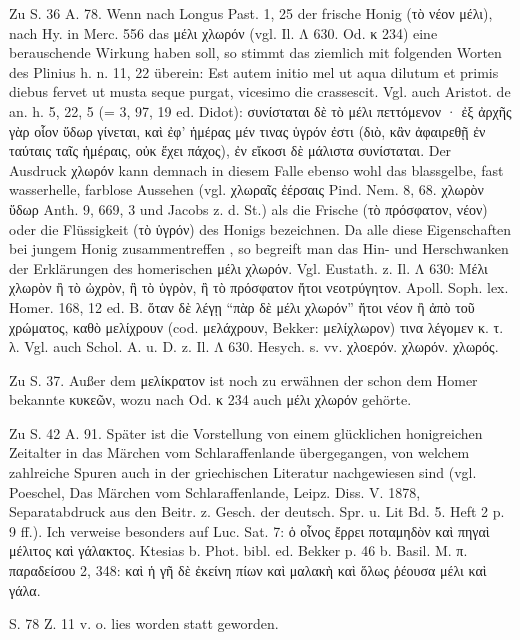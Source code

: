 \documentclass[a4paper, 11pt, oneside]{article}
\begin{document}
Zu S. 36 A. 78. Wenn nach Longus Past. 1, 25 der frische Honig (τὸ νέον μέλι), nach Hy. in Merc. 556 das μέλι χλωρόν (vgl. Il. Λ 630. Od. κ 234) eine berauschende Wirkung haben soll, so stimmt das ziemlich mit folgenden Worten des Plinius h. n. 11, 22 überein: Est autem initio mel ut aqua dilutum et primis diebus fervet ut musta seque purgat, vicesimo die crassescit. Vgl. auch Aristot. de an. h. 5, 22, 5 (= 3, 97, 19 ed. Didot): συνίσταται δὲ τὸ μέλι πεττόμενον · ἐξ ἀρχῆς γὰρ οἷον ὕδωρ γίνεται, καὶ ἐφ' ἡμέρας μέν τινας ὑγρόν ἐστι (διὸ, κἂν ἀφαιρεθῇ ἐν ταύταις ταῖς ἡμέραις, οὐκ ἔχει πάχος), ἐν εἴκοσι δὲ μάλιστα συνίσταται. Der Ausdruck χλωρόν kann demnach in diesem Falle ebenso wohl das blassgelbe, fast wasserhelle, farblose Aussehen (vgl. χλωραῖς ἐέρσαις Pind. Nem. 8, 68. χλωρὸν ὕδωρ Anth. 9, 669, 3 und Jacobs z. d. St.) als die Frische (τὸ πρόσφατον, νέον) oder die Flüssigkeit (τὸ ὑγρόν) des Honigs bezeichnen. Da alle diese Eigenschaften bei jungem Honig zusammentreffen , so begreift man das Hin- und Herschwanken der Erklärungen des homerischen μέλι χλωρόν. Vgl. Eustath. z. Il. Λ 630: Μέλι χλωρὸν ἢ τὸ ὠχρὸν, ἢ τὸ ὑγρὸν, ἢ τὸ πρόσφατον ἤτοι νεοτρύγητον. Apoll. Soph. lex. Homer. 168, 12 ed. B. ὅταν δὲ λέγῃ "`πὰρ δὲ μέλι χλωρόν"' ἤτοι νέον ἢ ἀπὸ τοῦ χρώματος, καθὸ μελίχρουν (cod. μελάχρουν, Bekker: μελίχλωρον) τινα λέγομεν κ. τ. λ. Vgl. auch Schol. A. u. D. z. Il. Λ 630. Hesych. s. vv. χλοερόν. χλωρόν. χλωρός.

Zu S. 37. Außer dem μελίκρατον ist noch zu erwähnen der schon dem Homer bekannte κυκεῶν, wozu nach Od. κ 234 auch μέλι χλωρόν gehörte.

Zu S. 42 A. 91. Später ist die Vorstellung von einem glücklichen honigreichen Zeitalter in das Märchen vom Schlaraffenlande übergegangen, von welchem zahlreiche Spuren auch in der griechischen Literatur nachgewiesen sind (vgl. Poeschel, Das Märchen vom Schlaraffenlande, Leipz. Diss. V. 1878, Separatabdruck aus den Beitr. z. Gesch. der deutsch. Spr. u. Lit Bd. 5. Heft 2 p. 9 ff.). Ich verweise besonders auf Luc. Sat. 7: ὁ οἶνος ἔρρει ποταμηδὸν καὶ πηγαὶ μέλιτος καὶ γάλακτος. Ktesias b. Phot. bibl. ed. Bekker p. 46 b. Basil. M. π. παραδείσου 2, 348: καὶ ἡ γῆ δὲ ἐκείνη πίων καὶ μαλακὴ καὶ ὅλως ῥέουσα μέλι καὶ γάλα.

S. 78 Z. 11 v. o. lies worden statt geworden.
\end{document}
